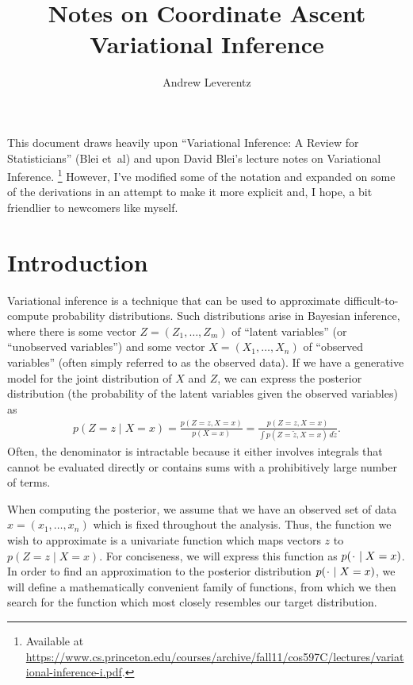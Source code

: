 \documentclass[11pt]{article}
\title{Notes on Coordinate Ascent Variational Inference}
\author{Andrew Leverentz}
\date{}
\newcommand*{\placeholder}{\makebox[1ex]{$\cdot$}}
\begin{document}
\maketitle

\begin{sloppypar}
This document draws heavily upon ``Variational Inference: A Review for Statisticians'' (Blei et~al) and upon David Blei's lecture notes on Variational Inference.%
\footnote{Available at \url{https://www.cs.princeton.edu/courses/archive/fall11/cos597C/lectures/variational-inference-i.pdf}.}
However, I've modified some of the notation and expanded on some of the derivations in an attempt to make it more explicit and, I hope, a bit friendlier to newcomers like myself.
\end{sloppypar}

\section{Introduction}

Variational inference is a technique that can be used to approximate difficult-to-compute probability distributions.
Such distributions arise in Bayesian inference, where there is some vector $Z = (Z_1, \ldots, Z_m)$ of ``latent variables'' (or ``unobserved variables'') and some vector $X = (X_1, \ldots, X_n)$ of ``observed variables'' (often simply referred to as the observed data).
If we have a generative model for the joint distribution of $X$ and $Z$, we can express the posterior distribution (the probability of the latent variables given the observed variables) as
\begin{align}
p(Z = z \mid X = x) = \frac{p(Z=z, X=x)}{p(X=x)} = \frac{p(Z=z, X=x)}{\int p(Z = \tilde{z}, X = x) \, d\tilde{z}}.
\end{align}
Often, the denominator is intractable because it either involves integrals that cannot be evaluated directly or contains sums with a prohibitively large number of terms.

When computing the posterior, we assume that we have an observed set of data $x = (x_1, \ldots, x_n)$ which is fixed throughout the analysis.
Thus, the function we wish to approximate is a univariate function which maps vectors $z$ to $p(Z = z \mid X = x)$.
For conciseness, we will express this function as $p(\placeholder \mid X = x)$.
In order to find an approximation to the posterior distribution $p(\placeholder \mid X = x)$, we will define a mathematically convenient family of functions, from which we then search for the function which most closely resembles our target distribution.
\end{document}
